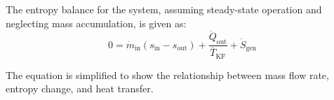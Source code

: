 The entropy balance for the system, assuming steady-state operation and neglecting mass accumulation, is given as:  
\[
0 = \dot{m}_{\text{in}}(s_{\text{in}} - s_{\text{out}}) + \frac{\dot{Q}_{\text{out}}}{\bar{T}_{\text{KF}}} + \dot{S}_{\text{gen}}
\]  

The equation is simplified to show the relationship between mass flow rate, entropy change, and heat transfer.